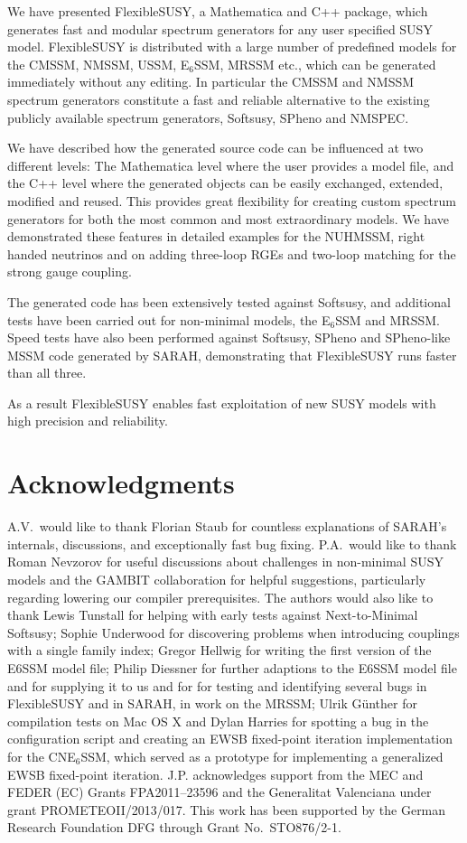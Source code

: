 \documentclass[final,3p,11pt,pdflatex]{elsarticle}
\makeatletter
\newcommand{\fs}{FlexibleSUSY\@\xspace}
\newcommand{\mathematica}{Mathematica\xspace}
\newcommand{\ESSM}{E$_6$SSM\@\xspace}
\makeatother
\begin{document}
We have presented \fs, a Mathematica and C++ package, which generates fast and
modular spectrum generators for any user specified SUSY model.  \fs is
distributed with a large number of predefined models for the CMSSM,
NMSSM, USSM, \ESSM, MRSSM etc., which can be generated immediately
without any editing.  In particular the CMSSM and NMSSM spectrum
generators constitute a fast and reliable alternative to the existing
publicly available spectrum generators, Softsusy, SPheno and
NMSPEC. 

We have described how the generated source code can be influenced at
two different levels: The \mathematica level where the user provides a
model file, and the C++ level where the generated objects can be
easily exchanged, extended, modified and reused.  This provides great
flexibility for creating custom spectrum generators for both the most
common and most extraordinary models.  We have demonstrated these
features in detailed examples for the NUHMSSM, right handed neutrinos
and on adding three-loop RGEs and two-loop matching for the strong
gauge coupling.  

The generated code has been extensively tested against Softsusy, and
additional tests have been carried out for non-minimal models, the
\ESSM and MRSSM.  Speed tests have also been performed against
Softsusy, SPheno and SPheno-like MSSM code generated by SARAH,
demonstrating that \fs runs faster than all three.

As a result \fs enables fast exploitation of new SUSY models with high
precision and reliability.

\section*{Acknowledgments}

A.V.\ would like to thank Florian Staub for countless explanations of
SARAH's internals, discussions, and exceptionally fast bug
fixing. P.A.~would like to thank Roman Nevzorov for useful discussions
about challenges in non-minimal SUSY models and the GAMBIT
collaboration for helpful suggestions, particularly regarding
lowering our compiler prerequisites. The authors would also like to
thank Lewis Tunstall for helping with early tests against
Next-to-Minimal Softsusy; Sophie Underwood for discovering problems
when introducing couplings with a single family index; Gregor Hellwig
for writing the first version of the E6SSM model file; Philip Diessner
for further adaptions to the E6SSM model file and for supplying it to
us and for for testing and identifying several bugs in \fs and in
SARAH, in work on the MRSSM; Ulrik Günther for compilation tests on
Mac OS X and Dylan Harries for spotting a bug in the configuration
script and creating an EWSB fixed-point iteration implementation for
the CNE$_6$SSM, which served as a prototype for implementing a
generalized EWSB fixed-point iteration.
%
J.P. acknowledges support from the MEC and FEDER (EC) Grants
FPA2011--23596 and the Generalitat Valenciana under grant PROMETEOII/2013/017.
This work has been supported by the German Research Foundation DFG
through Grant No.~STO876/2-1.
\end{document}
